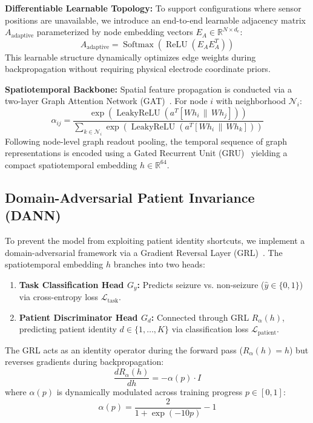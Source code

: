 \documentclass[journal]{IEEEtran}
\begin{document}
\textbf{Differentiable Learnable Topology:} To support configurations where sensor positions are unavailable, we introduce an end-to-end learnable adjacency matrix $A_{\text{adaptive}}$ parameterized by node embedding vectors $E_A \in \mathbb{R}^{N \times d_e}$:
\begin{equation}
A_{\text{adaptive}} = \operatorname{Softmax}\left(\operatorname{ReLU}\left(E_A E_A^T\right)\right)
\end{equation}
This learnable structure dynamically optimizes edge weights during backpropagation without requiring physical electrode coordinate priors.

\textbf{Spatiotemporal Backbone:} Spatial feature propagation is conducted via a two-layer Graph Attention Network (GAT)~\cite{velickovic2018graph}. For node $i$ with neighborhood $\mathcal{N}_i$:
\begin{equation}
\alpha_{ij} = \frac{\exp\left(\operatorname{LeakyReLU}\left(a^T [W h_i \,\|\, W h_j]\right)\right)}{\sum_{k \in \mathcal{N}_i} \exp\left(\operatorname{LeakyReLU}\left(a^T [W h_i \,\|\, W h_k]\right)\right)}
\end{equation}
Following node-level graph readout pooling, the temporal sequence of graph representations is encoded using a Gated Recurrent Unit (GRU)~\cite{cho2014learning} yielding a compact spatiotemporal embedding $h \in \mathbb{R}^{64}$.

\subsection{Domain-Adversarial Patient Invariance (DANN)}
To prevent the model from exploiting patient identity shortcuts, we implement a domain-adversarial framework via a Gradient Reversal Layer (GRL)~\cite{ganin2016domain}. The spatiotemporal embedding $h$ branches into two heads:
\begin{enumerate}
    \item \textbf{Task Classification Head $G_y$:} Predicts seizure vs. non-seizure ($\hat{y} \in \{0, 1\}$) via cross-entropy loss $\mathcal{L}_{\text{task}}$.
    \item \textbf{Patient Discriminator Head $G_d$:} Connected through GRL $R_\alpha(h)$, predicting patient identity $d \in \{1, \dots, K\}$ via classification loss $\mathcal{L}_{\text{patient}}$.
\end{enumerate}

The GRL acts as an identity operator during the forward pass ($R_\alpha(h) = h$) but reverses gradients during backpropagation:
\begin{equation}
\frac{d R_\alpha(h)}{d h} = -\alpha(p) \cdot I
\end{equation}
where $\alpha(p)$ is dynamically modulated across training progress $p \in [0, 1]$:
\begin{equation}
\alpha(p) = \frac{2}{1 + \exp(-10p)} - 1
\end{equation}
\end{document}
